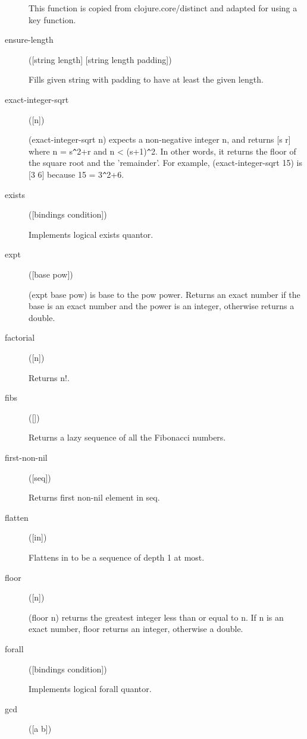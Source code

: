 \begin{description}
  This function is copied from clojure.core/distinct and adapted for using a key function.

  \item[ensure-length]
([string length] [string length padding])

Fills given string with padding to have at least the given length.

  \item[exact-integer-sqrt]
([n])

(exact-integer-sqrt n) expects a non-negative integer n, and returns [s r] where n = s\verb+^+2+r and n < (s+1)\verb+^+2.  In other words, it returns the floor of the square root and the 'remainder'.
For example, (exact-integer-sqrt 15) is [3 6] because 15 = 3\verb+^+2+6.

  \item[exists]
([bindings condition])

Implements logical exists quantor.

  \item[expt]
([base pow])

(expt base pow) is base to the pow power.
Returns an exact number if the base is an exact number and the power is an integer, otherwise returns a double.

  \item[factorial]
([n])

Returns n!.

  \item[fibs]
([])

Returns a lazy sequence of all the Fibonacci numbers.

  \item[first-non-nil]
([seq])

Returns first non-nil element in seq.

  \item[flatten]
([in])

Flattens in to be a sequence of depth 1 at most.

  \item[floor]
([n])

(floor n) returns the greatest integer less than or equal to n.
If n is an exact number, floor returns an integer, otherwise a double.

  \item[forall]
([bindings condition])

Implements logical forall quantor.

  \item[gcd]
([a b])


\end{description}
